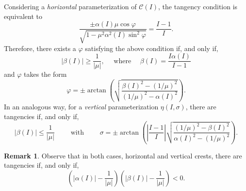 \documentclass[a4paper,10pt]{article}
\theoremstyle{definition}
\newtheorem{remark}[theorem]{Remark}
\begin{document}
Considering a \emph{horizontal} parameterization of $\mathcal{C}(I)$, the tangency condition is equivalent to
\begin{equation*}
\frac{\pm\alpha(I)\mu\cos\varphi}{\sqrt{1-\mu^2\alpha^2(I)\sin^2\varphi}} = \frac{I-1}{I}.
\end{equation*}
Therefore, there exists a $\varphi$ satisfying the above condition if, and only if,
\begin{equation*}
\left|\beta(I)\right| \geq \frac{1}{\left|\mu\right|},\quad\text{ where }\quad\beta(I) = \frac{I\alpha(I)}{I-1}\label{eq:condition_tan_hor}
\end{equation*}
and $\varphi$ takes the form
\begin{equation*}
\varphi =\pm \arctan\left(\sqrt{\frac{\beta(I)^2-(1/\mu)^2}{(1/\mu)^2-\alpha(I)^2}}\right).
\end{equation*}
In an analogous way, for a \emph{vertical} parameterization $\eta(I,\sigma)$, there are tangencies if, and only if,
\begin{equation*}
\left|\beta(I)\right|\leq \frac{1}{\left|\mu\right|} \quad\quad \text{ with }\quad\quad \sigma = \pm \arctan\left(\left|\frac{I-1}{I}\right|\sqrt{\frac{(1/\mu)^2 - \beta(I)^2}{\alpha(I)^2-(1/\mu)^2}}\right). \label{eq:condition_tan_ver}
\end{equation*}

\begin{remark}
Observe that in both cases, horizontal and vertical crests, there are tangencies if, and only if,
\begin{equation*}
\left(\left|\alpha(I)\right| - \frac{1}{\left|\mu\right|}\right)\left( \left|\beta(I)\right| - \frac{1}{\left|\mu\right|} \right) < 0.
\end{equation*}
\end{remark}
\end{document}
